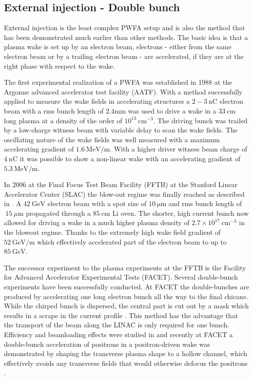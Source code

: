\subsection{External injection - Double bunch}
External injection is the least complex PWFA setup and is also the method that has been demonstrated much earlier than other methods. The basic idea is that a plasma wake is set up by an electron beam, electrons - either from the same electron beam or by a trailing electron beam - are accelerated, if they are at the right phase with respect to the wake.

The first experimental realization of a PWFA was established in 1988 at the Argonne advanced accelerator test facility (AATF)\cite{rosenzweig1988experimental}. With a method successfully applied to measure the wake fields in accelerating structures
a $2-3\ \mathrm{nC}$ electron beam with a rms bunch length of $2.4 \mathrm{mm}$ was used to drive a wake in a $33\ \mathrm{cm} $ long plasma at a density of the order of $ 10^{13}\ \mathrm{cm}^{-3}$. The driving bunch was trailed by a low-charge witness beam with variable delay to scan the wake fields.
The oscillating nature of the wake fields was well measured with a maximum accelerating gradient of $1.6\ \mathrm{MeV/m}$. 
With a higher driver witness beam charge of $4\ \mathrm{nC}$ \cite{figueroa1988direct} it was possible to show a non-linear wake with an accelerating gradient of $5.3\ \mathrm{MeV/m}$. 

In 2006 at the Final Focus Test Beam Facility (FFTB) at the Stanford Linear Accelerator Center (SLAC) the blow-out regime was finally reached as described in \cite{blumenfeld2007energyDoubling}.
A $42\ \mathrm{GeV}$ electron beam with a spot size of $10\ \mathrm{\mu m}$ and rms bunch length of $~15\ \mu\mathrm{m}$ propagated through a $85\ \mathrm{cm}$ Li oven. The shorter, high current bunch now allowed for driving a wake in a much higher plasma density of $2.7\times 10^{17}\ \mathrm{cm}^{-3} $ in the blowout regime. Thanks to the extremely high wake field gradient of $52\ \mathrm{GeV/m}$ which effectively accelerated part of the electron beam to up to $85\ \mathrm{GeV}$.

The successor experiment to the plasma experiments at the FFTB is the Facility for Advanced Accelerator Experimental Tests (FACET)\cite{clarke2012facet}. Several double-bunch experiments have been successfully conducted.  
At FACET the double-bunches are produced by accelerating one long electron bunch all the way to the final chicane. 
While the chirped bunch is dispersed, the central part is cut out by a mask which results in a scrape in the current profile  \cite{hogan2010FACET}. This method has the advantage that the transport of the beam along the LINAC is only required for one bunch.
Efficiency and beamloading effects were studied in \cite{litos2014high} and recently at FACET a double-bunch acceleration of positrons in a positron-driven wake was demonstrated by shaping the transverse plasma shape to a hollow channel, which effectively avoids any transverse fields that would otherwise defocus the positrons \cite{ThesisGessner}.
